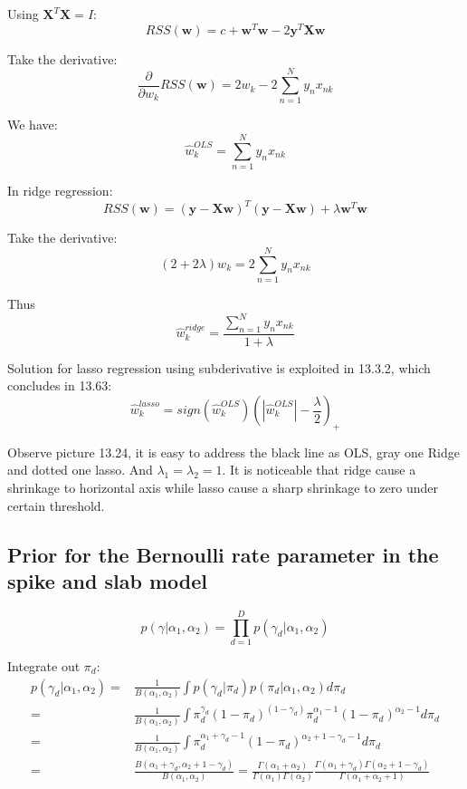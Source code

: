 \documentclass[UTF8]{ctexart}
\begin{document}
Using $\textbf{X}^{T}\textbf{X}=I$:
$$RSS(\textbf{w})=c+\textbf{w}^{T}\textbf{w}-2\textbf{y}^{T}\textbf{X}\textbf{w}$$

Take the derivative:
$$\frac{\partial}{\partial w_{k}}RSS(\textbf{w})=2w_{k}-2\sum_{n=1}^{N}y_{n}x_{nk}$$

We have:
$$\hat{w}_{k}^{OLS}=\sum_{n=1}^{N}y_{n}x_{nk}$$

In ridge regression:
$$RSS(\textbf{w})=(\textbf{y}-\textbf{X}\textbf{w})^{T}(\textbf{y}-\textbf{X}\textbf{w}) + \lambda \textbf{w}^{T}\textbf{w}$$

Take the derivative:
$$(2+2\lambda)w_{k} = 2\sum_{n=1}^{N}y_{n}x_{nk}$$

Thus
$$\hat{w}_{k}^{ridge}=\frac{\sum_{n=1}^{N}y_{n}x_{nk}}{1+\lambda}$$

Solution for lasso regression using subderivative is exploited in 13.3.2, which concludes in 13.63:
$$\hat{w}_{k}^{lasso}=sign(\hat{w}_{k}^{OLS})(|\hat{w}_{k}^{OLS}|-\frac{\lambda}{2})_{+}$$

Observe picture 13.24, it is easy to address the black line as OLS, gray one Ridge and dotted one lasso. And $\lambda_{1}=\lambda_{2}=1$. It is noticeable that ridge cause a shrinkage to horizontal axis while lasso cause a sharp shrinkage to zero under certain threshold.

\subsection{Prior for the Bernoulli rate parameter in the spike and slab model}
$$p(\gamma|\alpha_{1},\alpha_{2})=\prod_{d=1}^{D}p(\gamma_{d}|\alpha_{1},\alpha_{2})$$

Integrate out $\pi_{d}$:
\begin{align}
p(\gamma_{d}|\alpha_{1},\alpha_{2})=&\frac{1}{B(\alpha_{1},\alpha_{2})}\int p(\gamma_{d}|\pi_{d})p(\pi_{d}|\alpha_{1},\alpha_{2})d\pi_{d}\nonumber \\
=&\frac{1}{B(\alpha_{1},\alpha_{2})}\int \pi_{d}^{\gamma_{d}}(1-\pi_{d})^{(1-\gamma_{d})}\pi_{d}^{\alpha_{1}-1}(1-\pi_{d})^{\alpha_{2}-1}d\pi_{d}\nonumber \\
=&\frac{1}{B(\alpha_{1},\alpha_{2})}\int \pi_{d}^{\alpha_{1}+\gamma_{d}-1}(1-\pi_{d})^{\alpha_{2}+1-\gamma_{d} - 1}d\pi_{d}\nonumber \\
=&\frac{B(\alpha_{1}+\gamma_{d},\alpha_{2}+1-\gamma_{d})}{B(\alpha_{1},\alpha_{2})}=\frac{\Gamma(\alpha_{1}+\alpha_{2})}{\Gamma(\alpha_{1})\Gamma(\alpha_{2})} \frac{\Gamma(\alpha_{1}+\gamma_{d})\Gamma(\alpha_{2}+1-\gamma_{d})}{\Gamma(\alpha_{1}+\alpha_{2}+1)}\nonumber
\end{align}
\end{document}
